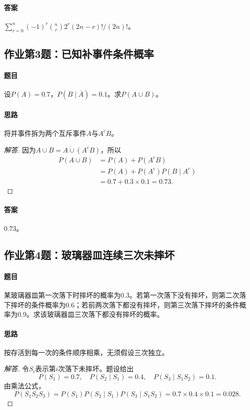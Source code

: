 \paragraph{答案}$\displaystyle\sum_{r=0}^n(-1)^r\binom nr2^r(2n-r)!/(2n)!$。

\subsection{作业第3题：已知补事件条件概率}\label{ex:w03-h3}
\paragraph{题目}
设$P(A)=0.7$，$P(B\mid\overline A)=0.1$。求$P(A\cup B)$。
\paragraph{思路}将并事件拆为两个互斥事件$A$与$A^cB$。
\begin{proof}[解答]
因为$A\cup B=A\mathbin{\dot\cup}(A^cB)$，所以
\begin{align*}
P(A\cup B)&=P(A)+P(A^cB)\\
&=P(A)+P(A^c)P(B\mid A^c)\\
&=0.7+0.3\times0.1=0.73.
\end{align*}
\end{proof}
\paragraph{答案}$0.73$。

\subsection{作业第4题：玻璃器皿连续三次未摔坏}\label{ex:w03-h4}
\paragraph{题目}
某玻璃器皿第一次落下时摔坏的概率为0.3。若第一次落下没有摔坏，则第二次落下摔坏的条件概率为0.6；若前两次落下都没有摔坏，则第三次落下摔坏的条件概率为0.9。求该玻璃器皿三次落下都没有摔坏的概率。
\paragraph{思路}按存活到每一次的条件顺序相乘，无须假设三次独立。
\begin{proof}[解答]
令$S_i$表示第$i$次落下未摔坏。题设给出
\[P(S_1)=0.7,\quad P(S_2\mid S_1)=0.4,\quad P(S_3\mid S_1S_2)=0.1.\]
由乘法公式，
\[P(S_1S_2S_3)=P(S_1)P(S_2\mid S_1)P(S_3\mid S_1S_2)
=0.7\times0.4\times0.1=0.028.\]
\end{proof}

